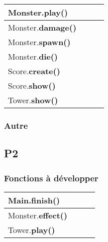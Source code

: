 \documentclass[a4paper]{article}
\begin{document}
\begin{tabular}{|l|c|c|c|}
      \hline
      Monster.\textbf{play()} & & & \\
      \hline
      Monster.\textbf{damage()} & & & \\
      \hline 
      Monster.\textbf{spawn()} & & & \\
      \hline
      Monster.\textbf{die()} & & & \\
      \hline
      \hline
      Score.\textbf{create()} & & & \\
      \hline
      Score.\textbf{show()} & & & \\
      \hline
      \hline
      Tower.\textbf{show()} & & & \\
      \hline
      
        \end{tabular}  
      
            \subsubsection{Autre}
        \subsection{P2}
            \subsubsection{Fonctions à développer}
            \begin{tabular}{|l|c|c|c|}
        \hline
        Main.\textbf{finish()} & & & \\
        \hline
        \hline
        Monster.\textbf{effect()} & & & \\
        \hline
        \hline
        Tower.\textbf{play()} & & & \\
        \end{tabular}
\end{document}
